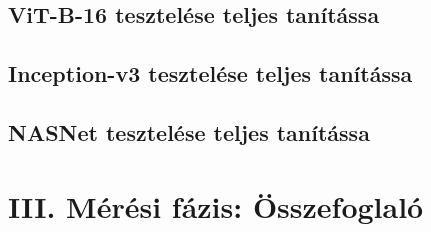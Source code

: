 \documentclass[	
  noindent
]{elteikthesis}[2024/04/26]
\begin{document}
    \subsection{ViT-B-16 tesztelése teljes tanítássa}
      
    \subsection{Inception-v3 tesztelése teljes tanítássa}
      
    \subsection{NASNet tesztelése teljes tanítássa}
      

  \section{III. Mérési fázis: Összefoglaló}
    

\listoffigures
\listoftables
\end{document}
